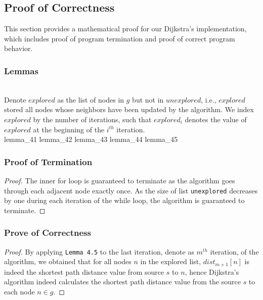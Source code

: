 \subsection{Proof of Correctness} \label{mproof}
This section provides a mathematical proof for our Dijkstra's implementation, which includes proof of program termination and proof of correct program behavior.

\subsubsection{Lemmas} \label{lemmasM}
\tab\\
Denote $explored$ as the list of nodes in $g$ but not in $unexplored$, i.e., $explored$ stored all nodes whose neighbors have been updated by the algorithm. We index $explored$ by the number of iterations, such that $explored_i$ denotes the value of $explored$ at the beginning of the $i^{th}$ iteration.
\tab\\
{lemma_41}
{lemma_42}
{lemma_43}
{lemma_44}
{lemma_45}
{}
\subsubsection{Proof of Termination} 
\begin{proof}{}
The inner for loop is guaranteed to terminate as the algorithm goes through each adjacent node exactly once. As the size of list \texttt{unexplored} decreases by one during each iteration of the while loop, the algorithm is guaranteed to terminate. 
\end{proof}

\subsubsection{Prove of Correctness}
\begin{proof}
By applying \texttt{Lemma 4.5} to the last iteration, denote as $m^{th}$ iteration, of the algorithm, we obtained that for all nodes $n$ in the explored list, $dist_{m+1}[n]$ is indeed the shortest path distance value from source $s$ to $n$, hence Dijkstra's algorithm indeed calculates the shortest path distance value from the source $s$ to each node $n \in g$. 
\end{proof}